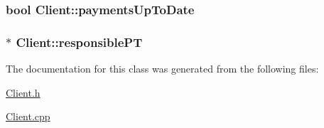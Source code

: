 \subsubsection[{\texorpdfstring{payments\+Up\+To\+Date}{paymentsUpToDate}}]{\setlength{\rightskip}{0pt plus 5cm}bool Client\+::payments\+Up\+To\+Date\hspace{0.3cm}{\ttfamily [private]}}\hypertarget{classClient_a3ddae3a0eb169cce62a3543f7fdd170e}{}\label{classClient_a3ddae3a0eb169cce62a3543f7fdd170e}
\subsubsection[{\texorpdfstring{responsible\+PT}{responsiblePT}}]{$\ast$ Client\+::responsible\+PT\hspace{0.3cm}{\ttfamily [private]}}\hypertarget{classClient_a24e7555c9620eb1161a403982ffcb8c7}{}\label{classClient_a24e7555c9620eb1161a403982ffcb8c7}


The documentation for this class was generated from the following files\+:\begin{DoxyCompactItemize}
\item 
\hyperlink{Client_8h}{Client.\+h}\item 
\hyperlink{Client_8cpp}{Client.\+cpp}\end{DoxyCompactItemize}
